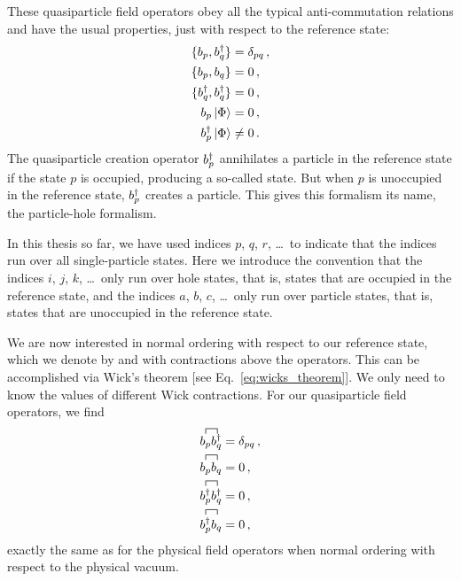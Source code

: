These quasiparticle field operators obey all the typical anti-commutation relations
and have the usual properties, just with respect to the reference state:
\begin{align}
  \{b_{p}, b_{q}^{\dagger}\}  & = \delta_{pq}\,, \\
  \{b_{p}, b_{q}\} & = 0 \,,          \\
  \{b_{q}^{\dagger}, b_{q}^{\dagger}\}   & = 0\,,           \\
  b_{p} \ket{\Phi}                 & = 0\,,           \\
  b_{p}^{\dagger} \ket{\Phi}                  & \neq 0\,.
\end{align}
The quasiparticle creation operator $b_{p}^{\dagger}$
annihilates a particle in the reference state if the state $p$ is occupied,
producing a so-called  state.
But when $p$ is unoccupied in the reference state,
$b_{p}^{\dagger}$ creates a particle.
This gives this formalism its name, the particle-hole formalism.

In this thesis so far,
we have used indices $p$, $q$, $r$, \ldots\ to indicate that
the indices run over all single-particle states.
Here we introduce the convention that the indices $i$, $j$, $k$, \ldots\
only run over hole states, that is, states that are occupied in the reference state,
and the indices $a$, $b$, $c$, \ldots\ only run over particle states,
that is, states that are unoccupied in the reference state.

We are now interested in normal ordering with respect to our reference state,
which we denote by \noref{\cdot} and with contractions above the operators.
This can be accomplished via Wick's theorem [see Eq.~\eqref{eq:wicks_theorem}].
We only need to know the values of different Wick contractions.
For our quasiparticle field operators, we find
\begin{align}
  \acontraction{}{\qpannih{p}}{}{\qpcrea{q}} \qpannih{p}\qpcrea{q}   & =  \delta_{pq}\,, \\
  \acontraction{}{\qpannih{p}}{}{\qpannih{q}} \qpannih{p}\qpannih{q} & = 0\,,            \\
  \acontraction{}{\qpcrea{p}}{}{\qpcrea{q}} \qpcrea{p}\qpcrea{q}     & = 0\,,            \\
  \acontraction{}{\qpcrea{p}}{}{\qpannih{q}} \qpcrea{p}\qpannih{q}   & = 0\,,
\end{align}
exactly the same as for the physical field operators
when normal ordering with respect to the physical vacuum.

